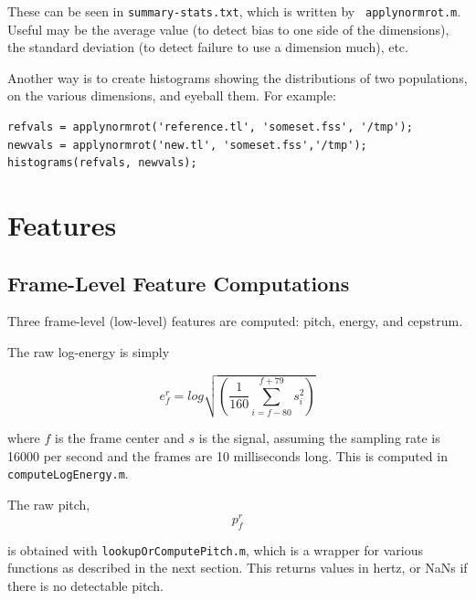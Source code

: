 \documentclass[11pt]{article}
\begin{document}
These can be seen in {\tt summary-stats.txt}, which is written by {\tt
  applynormrot.m}.  Useful may be the average value (to detect bias to
one side of the dimensions), the standard deviation (to detect failure
to use a dimension much), etc.

Another way is to create histograms showing the distributions of two
populations, on the various dimensions, and eyeball them.  For example:

\begin{verbatim}
refvals = applynormrot('reference.tl', 'someset.fss', '/tmp');
newvals = applynormrot('new.tl', 'someset.fss','/tmp');
histograms(refvals, newvals);
\end{verbatim}




\section{Features}               \label{sec:features}

\subsection{Frame-Level Feature Computations}

Three frame-level (low-level) features are computed: pitch, energy,
and cepstrum.

The raw log-energy is simply

\begin{equation}
e_f^r = log \sqrt{(\frac{1}{160} \sum\limits_{i=f-80}^{f+79} s_i^2)}
\end{equation}

where $f$ is the frame center and $s$ is the signal, assuming the
sampling rate is 16000 per second and the frames are 10 milliseconds
long.  This is computed in {\tt computeLogEnergy.m}.

The  raw pitch,
\begin{equation}
   p^r_f
\end{equation}


is obtained with {\tt lookupOrComputePitch.m}, which is a wrapper for
various functions as described in the next section.  This returns
values in hertz, or NaNs if there is no detectable pitch.
\end{document}
